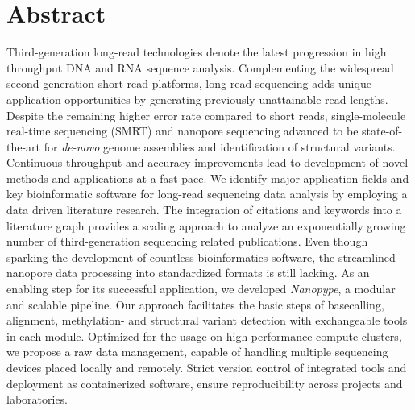 
\vspace*{10mm}
\section*{Abstract}
\label{sec:abstract}


Third-generation long-read technologies denote the latest progression in high throughput DNA and RNA sequence analysis.
Complementing the widespread second-generation short-read platforms, long-read sequencing adds unique application opportunities by generating previously unattainable read lengths.
Despite the remaining higher error rate compared to short reads, single-molecule real-time sequencing (SMRT) and nanopore sequencing advanced to be state-of-the-art for \textit{de-novo} genome assemblies and identification of structural variants.
Continuous throughput and accuracy improvements lead to development of novel methods and applications at a fast pace.
We identify major application fields and key bioinformatic software for long-read sequencing data analysis by employing a data driven literature research.
The integration of citations and keywords into a literature graph provides a scaling approach to analyze an exponentially growing number of third-generation sequencing related publications.
Even though sparking the development of countless bioinformatics software, the streamlined nanopore data processing into standardized formats is still lacking.
As an enabling step for its successful application, we developed \textit{Nanopype}, a modular and scalable pipeline. 
Our approach facilitates the basic steps of basecalling, alignment, methylation- and structural variant detection with exchangeable tools in each module.
Optimized for the usage on high performance compute clusters, we propose a raw data management, capable of handling multiple sequencing devices placed locally and remotely.
Strict version control of integrated tools and deployment as containerized software, ensure reproducibility across projects and laboratories.
